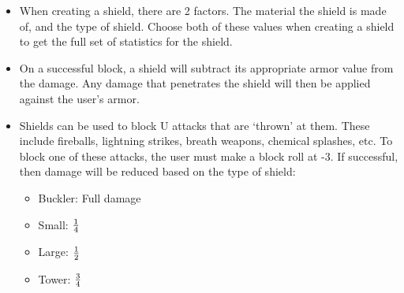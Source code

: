\documentclass[twoside]{book}
\begin{document}
\begin{itemize}
      
  \item   When creating a shield, there are 2 factors. The
                 material the shield is made of, and the type of shield.
                 Choose both of these values when creating a shield to
                 get the full set of statistics for the shield. 
  \item   On a successful block, a shield will subtract its
                 appropriate armor value from the damage. Any damage that
                 penetrates the shield will then be applied against the
                 user's armor. 
  \item   Shields can be used to block U attacks that are
                `thrown' at them. These include fireballs,
                lightning strikes, breath weapons, chemical splashes,
                etc. To block one of these attacks, the user must make a
                block roll at -3. If successful, then damage will be
                reduced based on the type of shield:
                
\begin{itemize}
      
  \item   Buckler: Full damage 
  \item   Small: \begin{math}{{ 1 }\over{ 4
                   }}\end{math}
                  
  \item   Large: \begin{math}{{ 1 }\over{ 2
                   }}\end{math}
                  
  \item   Tower: \begin{math}{{ 3 }\over{ 4
                   }}\end{math}
                  
\end{itemize}
    
              
\end{itemize}
  
\end{document}

